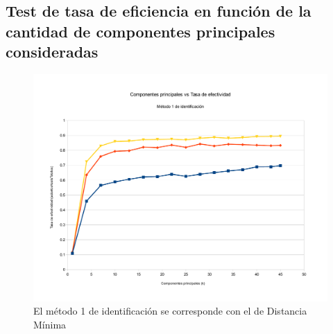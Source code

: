 \subsection{Test de tasa de eficiencia en función de la cantidad de componentes principales consideradas}
\begin{figure}[H]{}
\centering
\includegraphics[scale=0.5]{graphs/componentesPrincipalesVsTasaDeEfectividadM1.pdf}
\caption{El método 1 de identificación se corresponde con el de Distancia Mínima}
\label{CPvsTE}
\end{figure}


